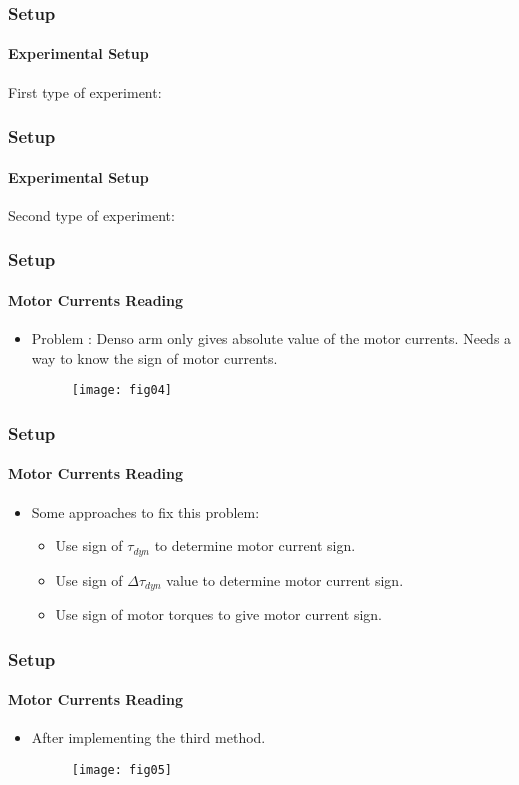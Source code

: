 \documentclass[12pt,english]{beamer}
\begin{document}
  \begin{frame}
    \frametitle{Setup}
    \framesubtitle{Experimental Setup}
    First type of experiment:
  \end{frame}
  
  \begin{frame}
    \frametitle{Setup}
    \framesubtitle{Experimental Setup}
    Second type of experiment:
  \end{frame}
  
  \begin{frame}
    \frametitle{Setup}
    \framesubtitle{Motor Currents Reading}
    \begin{itemize}
      \item Problem : Denso arm only gives absolute value of the motor currents. Needs a way to know the sign of motor currents.
      \begin{figure}
        \texttt{[image: fig04]}
      \end{figure}
    \end{itemize}
  \end{frame}  
  
  \begin{frame}
    \frametitle{Setup}
    \framesubtitle{Motor Currents Reading}
    \begin{itemize}
      \item Some approaches to fix this problem:
      \begin{itemize}
        \item Use sign of $\tau_{dyn}$ to determine motor current sign.
        \item Use sign of $\Delta \tau_{dyn}$ value to determine motor current sign.
        \item Use sign of motor torques to give motor current sign.
      \end{itemize}
    \end{itemize}
  \end{frame}  
  
  \begin{frame}
    \frametitle{Setup}
    \framesubtitle{Motor Currents Reading}
    \begin{itemize}
      \item After implementing the third method.
      \begin{figure}
        \texttt{[image: fig05]}
      \end{figure}
    \end{itemize}
  \end{frame}  
\end{document}
